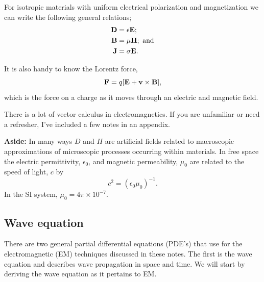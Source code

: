 For isotropic materials with uniform electrical polarization and magnetization
we can write the following general relations;
\begin{align}
    \vb{D} & = \epsilon \vb{E}; \\
    \vb{B} & = \mu \vb{H}; \mbox{ and} \\
    \vb{J} & = \sigma \vb{E}.
\end{align}

It is also handy to know the Lorentz force,
\begin{equation}
    \vb{F} = q[\vb{E} + \vb{v} \times \vb{B}],
\end{equation}
which is the force on a charge as it moves through an electric and magnetic
field.

There is a lot of vector calculus in electromagnetics.  If you are unfamiliar
or need a refresher, I've included a few notes in an appendix.

\begin{framed}
    {\bf Aside:} In many ways $D$ and $H$ are artificial fields related to macroscopic
    approximations of microscopic processes occurring within materials.  In free
    space the electric permittivity, $\epsilon_0$, and magnetic permeability,
    $\mu_0$ are related to the speed of light, $c$ by
    \begin{equation*}
        c^2 = (\epsilon_0 \mu_0)^{-1}.
    \end{equation*}
    In the SI system, $\mu_0 = 4 \pi \times 10^{-7}$.
\end{framed}


\subsection{Wave equation}
There are two general partial differential equations (PDE's) that use for the
electromagnetic (EM) techniques discussed in these notes.  The first is the
wave equation and describes wave propagation in space and time.  We will start
by deriving the wave equation as it pertains to EM. 

